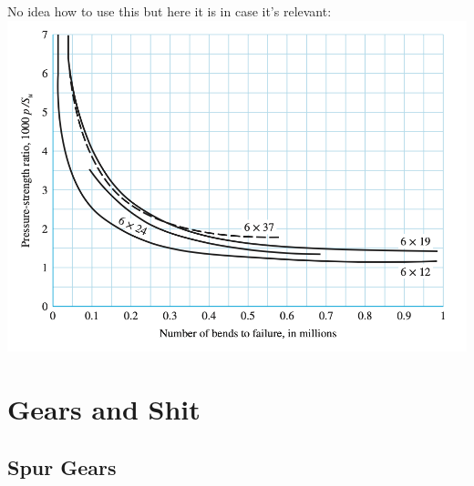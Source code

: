 \documentclass[11pt, fleqn]{article}
\begin{document}
No idea how to use this but here it is in case it's relevant:\\
\includegraphics[scale=0.75]{Belts/dumb_table.png}
\section{Gears and Shit}



\subsection{Spur Gears}
\end{document}
